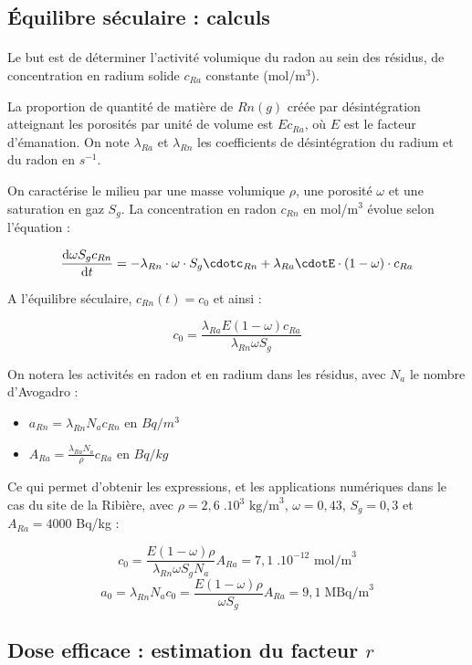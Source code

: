 \documentclass{article}
\begin{document}
\subsection{Équilibre séculaire : calculs }
\label{annexe:seculaire}

\paragraph{} Le but est de déterminer l'activité volumique du radon au sein des résidus, de concentration en radium solide $c_{Ra}$ constante (mol/m$^3$). 

La proportion de quantité de matière de $Rn(g)$ créée par désintégration atteignant les porosités par unité de volume est $E c_{Ra}$, où $E$ est le facteur d’émanation. On note $\lambda_{Ra}$ et $\lambda_{Rn}$ les coefficients de désintégration du radium et du radon en $s^{-1}$. 

On caractérise le milieu par une masse volumique $\rho$, une porosité $\omega$ et une saturation en gaz $S_g$. La concentration en radon $c_{Rn}$ en mol/m$^3$ évolue selon l'équation :

$$
\frac{\text{d} \omega S_g c_{Rn}}{\text{d}t} = - \lambda_{Rn}\cdot \omega\cdot S_g \cdotc_{Rn} + \lambda_{Ra} \cdotE \cdot(1-\omega)\cdot c_{Ra}
$$

A l'équilibre séculaire, $c_{Rn}(t)=c_0$ et ainsi :

$$
c_0 = \frac{ \lambda_{Ra} E (1-\omega) c_{Ra} }{\lambda_{Rn} \omega S_g}
$$

On notera les activités en radon et en radium dans les résidus, avec $N_a$ le nombre d'Avogadro :
\begin{itemize}
  \item $a_{Rn}= \lambda_{Rn} N_a c_{Rn}$ en $Bq/m^3$
  \item $A_{Ra}= \frac{\lambda_{Ra} N_a }{\rho} c_{Ra}$ en $Bq/kg$
\end{itemize}

Ce qui permet d'obtenir les expressions, et les applications numériques dans le cas du site de la Ribière, avec $\rho = 2,6 \;.10^3 \text{ kg/m}^3$, $\omega= 0,43$, $S_g=0,3$ et $A_{Ra}=4000$ Bq/kg :

$$
c_0 = \frac{ E (1-\omega) \rho }{\lambda_{Rn} \omega S_g N_a} A_{Ra} = 7,1 \; .10^{-12} \text{ mol/m}^3
$$
$$
a_0=\lambda_{Rn} N_a c_0 =\frac{E(1-\omega)\rho}{\omega S_g} A_{Ra} =9,1 \; \text{MBq/m}^3
$$

\subsection{Dose efficace : estimation du facteur $r$}
\label{annexe:estimation_r}
\end{document}
